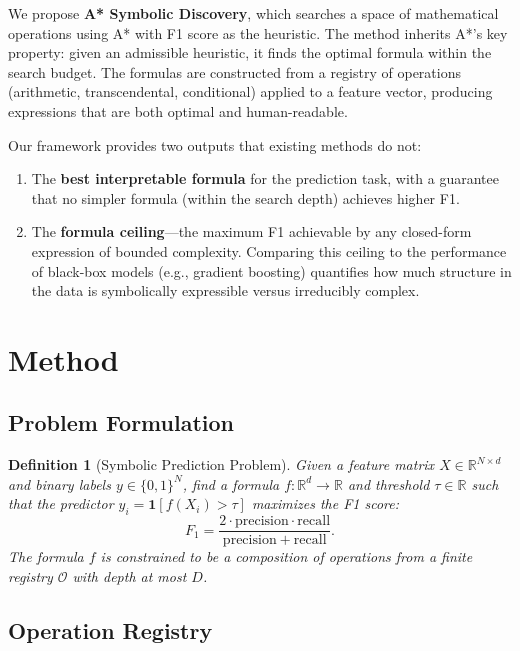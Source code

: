 \documentclass[11pt,a4paper]{article}
\newtheorem{definition}{Definition}
\begin{document}
We propose \textbf{A* Symbolic Discovery}, which searches a space of
mathematical operations using A* with F1 score as the heuristic. The
method inherits A*'s key property: given an admissible heuristic, it
finds the optimal formula within the search budget. The formulas are
constructed from a registry of operations (arithmetic, transcendental,
conditional) applied to a feature vector, producing expressions that
are both optimal and human-readable.

Our framework provides two outputs that existing methods do not:
\begin{enumerate}
\item The \textbf{best interpretable formula} for the prediction task,
with a guarantee that no simpler formula (within the search depth)
achieves higher F1.
\item The \textbf{formula ceiling}---the maximum F1 achievable by any
closed-form expression of bounded complexity. Comparing this ceiling
to the performance of black-box models (e.g., gradient boosting)
quantifies how much structure in the data is symbolically expressible
versus irreducibly complex.
\end{enumerate}

\section{Method}

\subsection{Problem Formulation}

\begin{definition}[Symbolic Prediction Problem]
Given a feature matrix $X \in \mathbb{R}^{N \times d}$ and binary
labels $y \in \{0, 1\}^N$, find a formula
$f: \mathbb{R}^d \to \mathbb{R}$ and threshold $\tau \in \mathbb{R}$
such that the predictor $\hat{y}_i = \mathbf{1}[f(X_i) > \tau]$
maximizes the F1 score:
\[
F_1 = \frac{2 \cdot \mathrm{precision} \cdot \mathrm{recall}}
           {\mathrm{precision} + \mathrm{recall}}.
\]
The formula $f$ is constrained to be a composition of operations from
a finite registry $\mathcal{O}$ with depth at most $D$.
\end{definition}

\subsection{Operation Registry}
\end{document}

